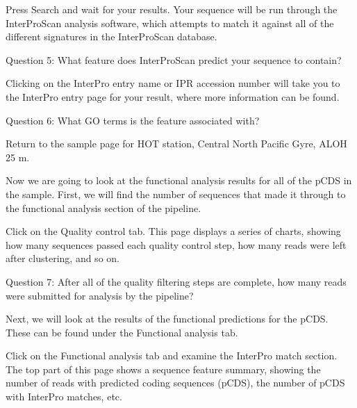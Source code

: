 \begin{steps}
Press Search and wait for your results. Your sequence will be run through the InterProScan analysis software, which attempts to match it against all of the different signatures in the InterProScan database.
\end{steps}

\begin{questions}
Question 5: What feature does InterProScan predict your sequence to contain? \end{questions}

\begin{information}
Clicking on the InterPro entry name or IPR accession number will take you to the InterPro entry page for your result, where more information can be found.
\end{information}

\begin{questions}
Question 6: What GO terms is the feature associated with?
\end{questions}

\begin{steps}
Return to the sample page for HOT station, Central North Pacific Gyre, ALOH 25 m.
\end{steps}

Now we are going to look at the functional analysis results for all of the pCDS in the sample. First, we will find the number of sequences that made it through to the functional analysis section of the pipeline.

\begin{steps}
Click on the Quality control tab. This page displays a series of charts, showing how many sequences passed each quality control step, how many reads were left after clustering, and so on.
\end{steps}

\begin{questions}
Question 7: After all of the quality filtering steps are complete, how many reads were submitted for analysis by the pipeline?
\end{questions}

Next, we will look at the results of the functional predictions for the pCDS. These can be found under the Functional analysis tab.

\begin{steps}
Click on the Functional analysis tab and examine the InterPro match section. The top part of this page shows a sequence feature summary, showing the number of reads with predicted coding sequences (pCDS), the number of pCDS with InterPro matches, etc.
\end{steps}

